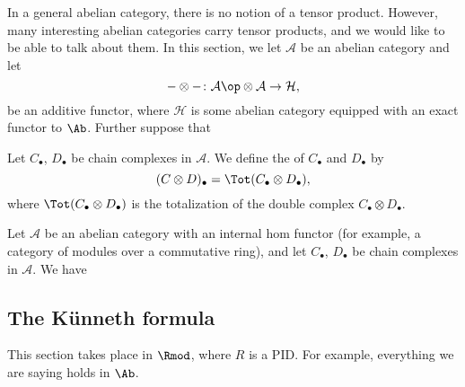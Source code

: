 \documentclass[main.tex]{subfiles}
\begin{document}
In a general abelian category, there is no notion of a tensor product. However, many interesting abelian categories carry tensor products, and we would like to be able to talk about them. In this section, we let $\mathcal{A}$ be an abelian category and let
\begin{equation*}
  -\otimes -\colon \mathcal{A}\op \otimes \mathcal{A} \to \mathcal{H},
\end{equation*}
be an additive functor, where $\mathcal{H}$ is some abelian category equipped with an exact functor to $\Ab$. Further suppose that

\begin{definition}
  \label{def:tensor_product_of_chain_complexes}
  Let $C_{\bullet}$, $D_{\bullet}$ be chain complexes in $\mathcal{A}$. We define the  of $C_{\bullet}$ and $D_{\bullet}$ by
  \begin{equation*}
    (C \otimes D)_{\bullet} = \Tot(C_{\bullet} \otimes D_{\bullet}),
  \end{equation*}
  where $\Tot(C_{\bullet} \otimes D_{\bullet})$ is the totalization of the double complex $C_{\bullet} \otimes D_{\bullet}$.
\end{definition}

\begin{definition}
  \label{def:internal_hom}
  Let $\mathcal{A}$ be an abelian category with an internal hom functor (for example, a category of modules over a commutative ring), and let $C_{\bullet}$, $D_{\bullet}$ be chain complexes in $\mathcal{A}$. We have
\end{definition}

\subsection{The Künneth formula}
\label{ssc:the_kunneth_formula}

This section takes place in $\Rmod$, where $R$ is a PID. For example, everything we are saying holds in $\Ab$.
\end{document}
